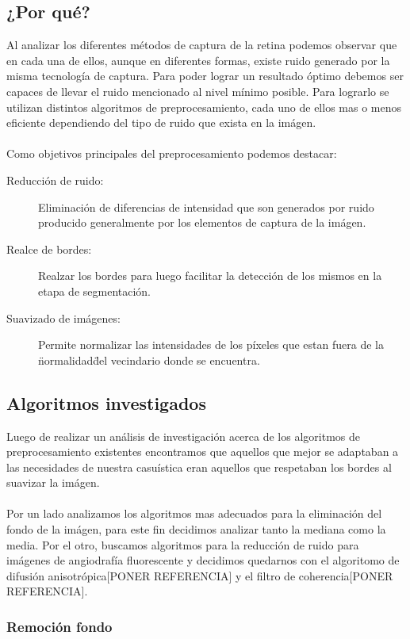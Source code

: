 \subsection{¿Por qu\'e?}
Al analizar los diferentes m\'etodos de captura de la retina podemos observar que en cada una de ellos, aunque en diferentes formas, existe ruido generado por la misma tecnolog\'ia de captura. Para poder lograr un resultado \'optimo debemos ser capaces de llevar el ruido mencionado al nivel m\'inimo posible. Para lograrlo se utilizan distintos algoritmos de preprocesamiento, cada uno de ellos mas o menos eficiente dependiendo del tipo de ruido que exista en la im\'agen.\\
\\
Como objetivos principales del preprocesamiento podemos destacar:
\begin{description}
  \item[Reducci\'on de ruido:] Eliminaci\'on de diferencias de intensidad que son generados por ruido producido generalmente por los elementos de captura de la im\'agen.
  \item[Realce de bordes:] Realzar los bordes para luego facilitar la detecci\'on de los mismos en la etapa de segmentaci\'on.
  \item[Suavizado de im\'agenes:] Permite normalizar las intensidades de los p\'ixeles que estan fuera de la \"normalidad\" del vecindario donde se encuentra.
\end{description}

\subsection{Algoritmos investigados}

Luego de realizar un an\'alisis de investigaci\'on acerca de los algoritmos de preprocesamiento existentes encontramos que aquellos que mejor se adaptaban a las necesidades de nuestra casu\'istica eran aquellos que respetaban los bordes al suavizar la im\'agen.\\
\\
Por un lado analizamos los algoritmos mas adecuados para la eliminaci\'on del fondo de la im\'agen, para este fin decidimos analizar tanto la mediana como la media. Por el otro, buscamos algoritmos para la reducci\'on de ruido para im\'agenes de angiodraf\'ia fluorescente y decidimos quedarnos con el algoritomo de difusi\'on anisotr\'opica[PONER REFERENCIA] y el filtro de coherencia[PONER REFERENCIA].

\subsubsection{Remoci\'on fondo}


